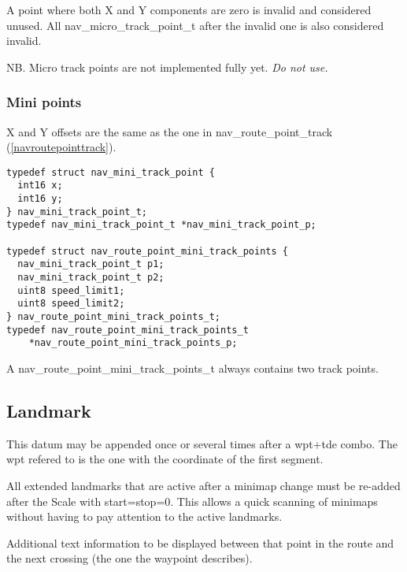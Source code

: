 \documentclass[a4paper]{article}
\begin{document}
A point where both X and Y components are zero is invalid and
considered unused. All nav\_micro\_track\_point\_t after the
invalid one is also considered invalid.

NB. Micro track points are not implemented fully yet. {\em Do not use.}

\subsubsection{Mini points}

  X and Y offsets are the same as the one in nav\_route\_point\_track 
  (\ref{navroutepointtrack}).

\begin{verbatim}
typedef struct nav_mini_track_point {
  int16 x;
  int16 y;
} nav_mini_track_point_t;
typedef nav_mini_track_point_t *nav_mini_track_point_p;

typedef struct nav_route_point_mini_track_points {
  nav_mini_track_point_t p1;
  nav_mini_track_point_t p2;
  uint8 speed_limit1;
  uint8 speed_limit2;
} nav_route_point_mini_track_points_t;
typedef nav_route_point_mini_track_points_t
    *nav_route_point_mini_track_points_p;

\end{verbatim}

A nav\_route\_point\_mini\_track\_points\_t always
contains two track points. 

\subsection{Landmark}
\label{Landmark}

This datum may be appended once or several times after a 
wpt+tde combo. The wpt refered to is the one with the coordinate
of the first segment.

All extended landmarks that are active after 
a minimap change must be re-added after the Scale with 
start=stop=0. This allows a quick scanning of minimaps
without having to pay attention to the active landmarks.

Additional text information to be displayed between that point
in the route and the next crossing (the one the waypoint describes).
\end{document}
